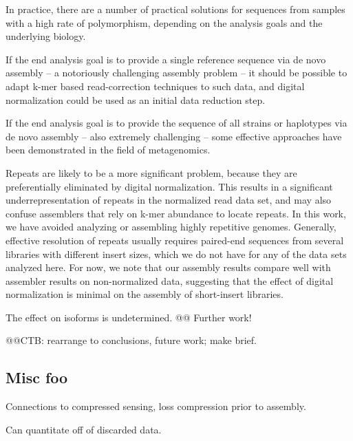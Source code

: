 \documentclass[10pt]{article}
\begin{document}
In practice, there are a number of practical solutions for sequences
from samples with a high rate of polymorphism, depending on the
analysis goals and the underlying biology.

If the end analysis goal is to provide a single reference sequence via
de novo assembly -- a notoriously challenging assembly problem -- it
should be possible to adapt k-mer based read-correction techniques to
such data, and digital normalization could be used as an initial data
reduction step.

If the end analysis goal is to provide the sequence of all strains or
haplotypes via de novo assembly -- also extremely challenging -- some
effective approaches have been demonstrated in the field of
metagenomics.

Repeats are likely to be a more significant problem, because they are
preferentially eliminated by digital normalization.  This results in a
significant underrepresentation of repeats in the normalized read data
set, and may also confuse assemblers that rely on k-mer abundance to
locate repeats.  In this work, we have avoided analyzing or assembling
highly repetitive genomes.  Generally, effective resolution of repeats
usually requires paired-end sequences from several libraries with
different insert sizes, which we do not have for any of the data sets
analyzed here.  For now, we note that our assembly results compare
well with assembler results on non-normalized data, suggesting that
the effect of digital normalization is minimal on the assembly of
short-insert libraries.

The effect on isoforms is undetermined.  @@  Further work!

@@CTB: rearrange to conclusions, future work; make brief.

\subsection*{Misc foo}

Connections to compressed sensing, loss compression prior to assembly.

Can quantitate off of discarded data.




\end{document}
